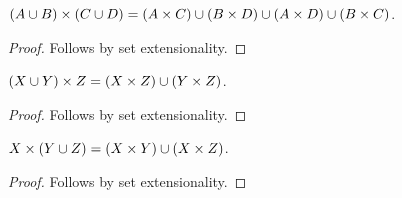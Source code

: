 \begin{proposition}\label{union_times}
    $(A\cup B)\times (C\cup D) = (A\times C)\cup (B\times D)\cup (A\times D)\cup (B\times C)$.
\end{proposition}
\begin{proof}
    Follows by set extensionality.
\end{proof}

\begin{proposition}\label{union_times_left}
    $(X\cup Y)\times Z = (X\times Z)\cup (Y\times Z)$.
\end{proposition}
\begin{proof}
    Follows by set extensionality.
\end{proof}

\begin{proposition}\label{union_times_right}
    $X\times (Y\cup Z) = (X\times Y)\cup (X\times Z)$.
\end{proposition}
\begin{proof}
    Follows by set extensionality.
\end{proof}
